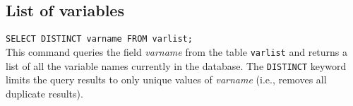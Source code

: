\subsection{List of variables}
\label{app:sqlvar}
\texttt{SELECT DISTINCT varname FROM var\textunderscore list;}\\

\noindent This command queries the field \textit{varname} from the table \texttt{var\textunderscore list} and returns a list of all the variable names currently in the database.  
The \texttt{DISTINCT} keyword limits the query results to only unique values of \textit{varname} (i.e., removes all duplicate results). 

